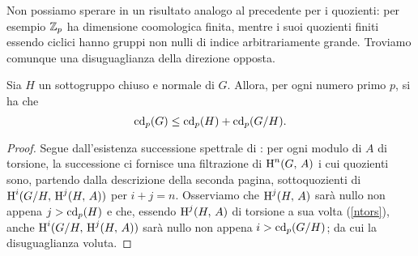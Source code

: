 Non possiamo sperare in un risultato analogo al precedente per i quozienti: per esempio $ \mathbb{Z}_p $ ha dimensione coomologica finita, mentre i suoi quozienti finiti essendo ciclici hanno gruppi non nulli di indice arbitrariamente grande. Troviamo comunque una disuguaglianza della direzione opposta.
\begin{proposition}\label{quozienti}
	Sia $ H $ un sottogruppo chiuso e normale di $ G $. Allora, per ogni numero primo $ p $, si ha che
	\[ \operatorname{cd}_p(G) \leq \operatorname{cd}_p(H) + \operatorname{cd}_p(G/H). \]
\end{proposition}
\begin{proof}
	Segue dall'esistenza successione spettrale di \HS: per ogni modulo di $ A $ di torsione, la successione ci fornisce una filtrazione di $ \operatorname{H}^n(G, \, A) $ i cui quozienti sono, partendo dalla descrizione della seconda pagina, sottoquozienti di $ \operatorname{H}^i(G/H, \, \operatorname{H}^j(H, \, A)) $ per $ i+j = n $. Osserviamo che $ \operatorname{H}^j(H, \, A) $ sarà nullo non appena $ j > \operatorname{cd}_p(H) $ e che, essendo $ \operatorname{H}^j(H, \, A) $ di torsione a sua volta (\ref{ntors}), anche $ \operatorname{H}^i(G/H, \, \operatorname{H}^j(H, \, A)) $ sarà nullo non appena $ i > \operatorname{cd}_p(G/H) $; da cui la disuguaglianza voluta.
\end{proof}